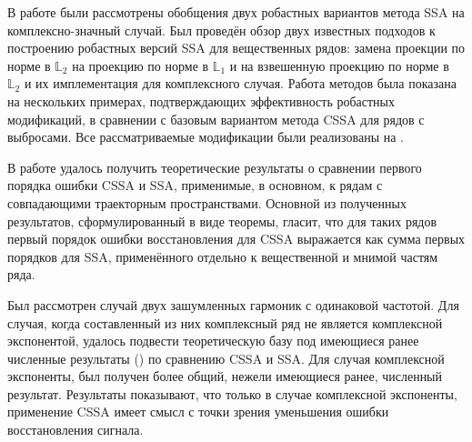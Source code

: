 \documentclass[specialist,
               substylefile = spbu.rtx,
               subf,href,colorlinks=true, 12pt]{disser}
\begin{document}


\conclusion
В работе были рассмотрены обобщения двух робастных вариантов метода SSA на комплексно-значный случай.
Был проведён обзор двух известных подходов к построению робастных версий SSA для вещественных рядов: замена проекции по норме в $\mathbb{L}_2$ на проекцию по норме в $\mathbb{L}_1$ и на взвешенную проекцию по норме в $\mathbb{L}_2$ и их имплементация для комплексного случая.
Работа методов была показана на нескольких примерах, подтверждающих эффективность робастных модификаций, в сравнении с базовым вариантом метода CSSA для рядов с выбросами. Все рассматриваемые модификации были реализованы на  \cite{Senov2022}.

В работе удалось получить теоретические результаты о сравнении первого порядка ошибки CSSA и SSA, применимые, в основном, к рядам с совпадающими траекторным пространствами. Основной из полученных результатов, сформулированный в виде теоремы, гласит, что для таких рядов первый порядок ошибки восстановления для CSSA выражается как сумма первых порядков для SSA, применённого отдельно к вещественной и мнимой частям ряда.

Был рассмотрен случай двух зашумленных гармоник с одинаковой частотой. Для случая, когда составленный из них комплексный ряд не является комплексной экспонентой, удалось подвести теоретическую базу под имеющиеся ранее численные результаты (\cite{Golyandina.etal2013}) по сравнению CSSA и SSA. Для случая комплексной экспоненты, был получен более общий, нежели имеющиеся ранее, численный результат.
Результаты показывают, что только в случае комплексной экспоненты, применение CSSA имеет смысл с точки зрения уменьшения ошибки восстановления сигнала.
\end{document}
